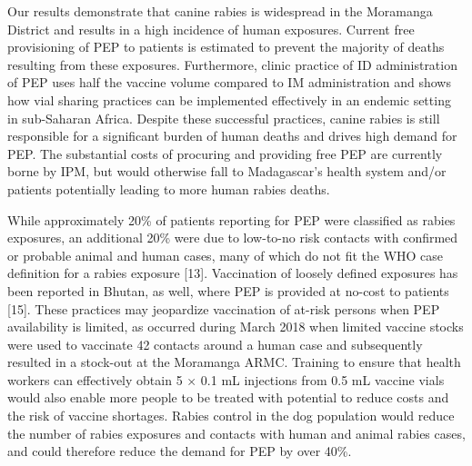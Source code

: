 \documentclass[
  oneside]{book}
\begin{document}
Our results demonstrate that canine rabies is widespread in the Moramanga District and results in a high incidence of human exposures. Current free provisioning of PEP to patients is estimated to prevent the majority of deaths resulting from these exposures. Furthermore, clinic practice of ID administration of PEP uses half the vaccine volume compared to IM administration and shows how vial sharing practices can be implemented effectively in an endemic setting in sub-Saharan Africa. Despite these successful practices, canine rabies is still responsible for a significant burden of human deaths and drives high demand for PEP. The substantial costs of procuring and providing free PEP are currently borne by IPM, but would otherwise fall to Madagascar's health system and/or patients potentially leading to more human rabies deaths.

While approximately 20\% of patients reporting for PEP were classified as rabies exposures, an additional 20\% were due to low-to-no risk contacts with confirmed or probable animal and human cases, many of which do not fit the WHO case definition for a rabies exposure {[}13{]}. Vaccination of loosely defined exposures has been reported in Bhutan, as well, where PEP is provided at no-cost to patients {[}15{]}. These practices may jeopardize vaccination of at-risk persons when PEP availability is limited, as occurred during March 2018 when limited vaccine stocks were used to vaccinate 42 contacts around a human case and subsequently resulted in a stock-out at the Moramanga ARMC. Training to ensure that health workers can effectively obtain 5 × 0.1 mL injections from 0.5 mL vaccine vials would also enable more people to be treated with potential to reduce costs and the risk of vaccine shortages. Rabies control in the dog population would reduce the number of rabies exposures and contacts with human and animal rabies cases, and could therefore reduce the demand for PEP by over 40\%.
\end{document}
